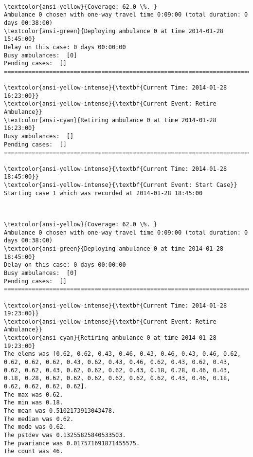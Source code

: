 \documentclass[11pt]{article}
\begin{document}
    \begin{center}
    \end{center}
    { \hspace*{\fill} \\}
    
    \begin{Verbatim}[commandchars=\\\{\}]
\textcolor{ansi-yellow}{Coverage: 62.0 \%. }
Ambulance 0 chosen with one-way travel time 0:09:00 (total duration: 0 days 00:38:00)
\textcolor{ansi-green}{Deploying ambulance 0 at time 2014-01-28 15:45:00}
Delay on this case: 0 days 00:00:00
Busy ambulances:  [0]
Pending cases:  []
========================================================================

\textcolor{ansi-yellow-intense}{\textbf{Current Time: 2014-01-28 16:23:00}}
\textcolor{ansi-yellow-intense}{\textbf{Current Event: Retire Ambulance}}
\textcolor{ansi-cyan}{Retiring ambulance 0 at time 2014-01-28 16:23:00}
Busy ambulances:  []
Pending cases:  []
========================================================================

\textcolor{ansi-yellow-intense}{\textbf{Current Time: 2014-01-28 18:45:00}}
\textcolor{ansi-yellow-intense}{\textbf{Current Event: Start Case}}
Starting case 1 which was recorded at 2014-01-28 18:45:00

    \end{Verbatim}

    \begin{center}
    \end{center}
    { \hspace*{\fill} \\}
    
    \begin{Verbatim}[commandchars=\\\{\}]
\textcolor{ansi-yellow}{Coverage: 62.0 \%. }
Ambulance 0 chosen with one-way travel time 0:09:00 (total duration: 0 days 00:38:00)
\textcolor{ansi-green}{Deploying ambulance 0 at time 2014-01-28 18:45:00}
Delay on this case: 0 days 00:00:00
Busy ambulances:  [0]
Pending cases:  []
========================================================================

\textcolor{ansi-yellow-intense}{\textbf{Current Time: 2014-01-28 19:23:00}}
\textcolor{ansi-yellow-intense}{\textbf{Current Event: Retire Ambulance}}
\textcolor{ansi-cyan}{Retiring ambulance 0 at time 2014-01-28 19:23:00}
The elems was [0.62, 0.62, 0.43, 0.46, 0.43, 0.46, 0.43, 0.46, 0.62, 0.62, 0.62, 0.62, 0.43, 0.62, 0.43, 0.46, 0.62, 0.43, 0.62, 0.43, 0.62, 0.62, 0.43, 0.62, 0.62, 0.62, 0.43, 0.18, 0.28, 0.46, 0.43, 0.18, 0.28, 0.62, 0.62, 0.62, 0.62, 0.62, 0.62, 0.43, 0.46, 0.18, 0.62, 0.62, 0.62, 0.62]. 
The max was 0.62. 
The min was 0.18. 
The mean was 0.5102173913043478. 
The median was 0.62. 
The mode was 0.62. 
The pstdev was 0.13255825840533503. 
The pvariance was 0.017571691871455575. 
The count was 46. 

    \end{Verbatim}
\end{document}
